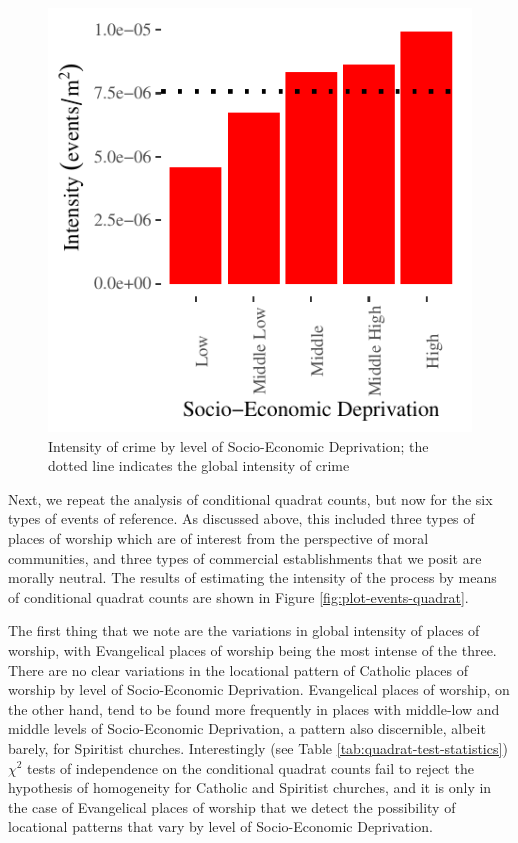 \documentclass[smallextended]{svjour3}       %
\begin{document}
\begin{figure}
\centering
\includegraphics{Moral_Communities_and_Crime_files/figure-latex/plot-crime-quadrat-1.pdf}
\caption{\label{fig:plot-crime-quadrat}Intensity of crime by level of
Socio-Economic Deprivation; the dotted line indicates the global
intensity of crime}
\end{figure}

Next, we repeat the analysis of conditional quadrat counts, but now for
the six types of events of reference. As discussed above, this included
three types of places of worship which are of interest from the
perspective of moral communities, and three types of commercial
establishments that we posit are morally neutral. The results of
estimating the intensity of the process by means of conditional quadrat
counts are shown in Figure \ref{fig:plot-events-quadrat}.

The first thing that we note are the variations in global intensity of
places of worship, with Evangelical places of worship being the most
intense of the three. There are no clear variations in the locational
pattern of Catholic places of worship by level of Socio-Economic
Deprivation. Evangelical places of worship, on the other hand, tend to
be found more frequently in places with middle-low and middle levels of
Socio-Economic Deprivation, a pattern also discernible, albeit barely,
for Spiritist churches. Interestingly (see Table
\ref{tab:quadrat-test-statistics}) \(\chi^2\) tests of independence on
the conditional quadrat counts fail to reject the hypothesis of
homogeneity for Catholic and Spiritist churches, and it is only in the
case of Evangelical places of worship that we detect the possibility of
locational patterns that vary by level of Socio-Economic Deprivation.
\end{document}
